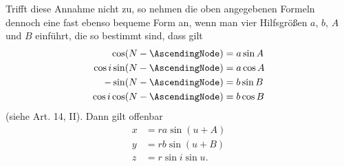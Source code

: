 Trifft diese Annahme nicht zu, so nehmen die oben angegebenen Formeln dennoch eine fast ebenso bequeme Form an, wenn man vier Hilfsgrößen $a$, $b$, $A$ und $B$ einführt, die so bestimmt sind, dass gilt\HistoricalNoteEight{Handschriftliche Bemerkung, wozu vgl. Seite 69 Zeile 7:]
\[
\begin{aligned}
-\cos\AscendingNode'&=a\sin A\\
\cos i'\sin\AscendingNode'&=a\cos A\\
-\sin\AscendingNode'&=b\sin B\\
-\cos i'\cos\AscendingNode'&=b\cos B.
\end{aligned}
\]
}
\[
\begin{aligned}
\cos(N-\AscendingNode)&=a\sin A\\
\cos i\sin(N-\AscendingNode)&=a\cos A\\
-\sin(N-\AscendingNode)&=b\sin B\\
\cos i\cos(N-\AscendingNode)&=b\cos B
\end{aligned}
\]
(siehe Art. 14, II). Dann gilt offenbar
\[
\begin{aligned}
x&=ra\sin(u+A)\\
y&=rb\sin(u+B)\\
z&=r\sin i\sin u.
\end{aligned}
\]
